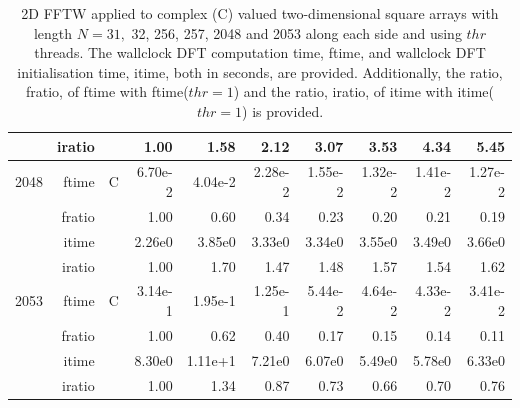 \documentclass[a4paper]{article}
\begin{document}
\begin{table}[htbp]
\begin{center}
\begin{small}
\begin{tabular}{|r|r|r|r|r|r|r|r|r|r|}
     & iratio & &       1.00 &   1.58 &   2.12 &   3.07 &   3.53 &   4.34 &   5.45      \\ \hline 
  2048  & ftime & C  &  6.70e-2 &   4.04e-2 &   2.28e-2 &   1.55e-2 &   1.32e-2 &   1.41e-2 &   1.27e-2   \\ 
      & fratio & &      1.00 &   0.60 &   0.34 &   0.23 &   0.20 &   0.21 &   0.19     \\ 
     & itime & &        2.26e0 &   3.85e0 &   3.33e0 &   3.34e0 &   3.55e0 &   3.49e0 &   3.66e0     \\ 
     & iratio & &       1.00 &   1.70 &   1.47 &   1.48 &   1.57 &   1.54 &   1.62      \\ \hline 
  2053  & ftime & C  &  3.14e-1 &   1.95e-1 &   1.25e-1 &   5.44e-2 &   4.64e-2 &   4.33e-2 &   3.41e-2   \\ 
      & fratio & &      1.00 &   0.62 &   0.40 &   0.17 &   0.15 &   0.14 &   0.11     \\ 
     & itime & &        8.30e0 &   1.11e+1 &   7.21e0 &   6.07e0 &   5.49e0 &   5.78e0 &   6.33e0     \\ 
     & iratio & &       1.00 &   1.34 &   0.87 &   0.73 &   0.66 &   0.70 &   0.76      \\ \hline
\end{tabular}
\caption{2D FFTW applied to complex (C) valued two-dimensional square arrays with length $N=31,$ 32, 256, 257, 2048 and 2053 along each side and using $thr$ threads. The wallclock DFT computation time, ftime, and wallclock DFT initialisation time, itime, both in seconds, are provided. Additionally,  the ratio, fratio, of ftime  with ftime($thr=1$) and the ratio, iratio, of itime  with itime($thr=1$) is provided. }\label{TblFFTW2dc}
\end{small}
\end{center}
\end{table}
\end{document}
